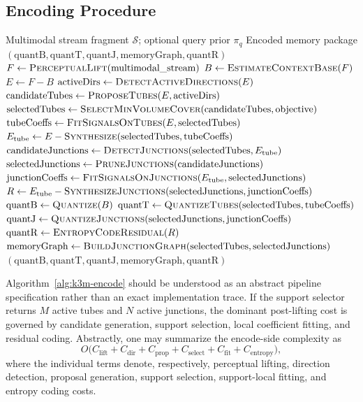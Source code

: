\documentclass[11pt]{article}
\begin{document}
\subsection{Encoding Procedure}
\begin{algorithm}[h]
\caption{Reference support-first K3M encoding procedure}
\label{alg:k3m-encode}
\begin{algorithmic}[1]
\Require Multimodal stream fragment $\mathcal{S}$; optional query prior $\pi_q$
\Ensure Encoded memory package $(\mathrm{quantB}, \mathrm{quantT}, \mathrm{quantJ}, \mathrm{memoryGraph}, \mathrm{quantR})$
\State $F \gets \Call{PerceptualLift}{\text{multimodal\_stream}}$
\State $B \gets \Call{EstimateContextBase}{F}$
\State $E \gets F - B$
\State $\mathrm{activeDirs} \gets \Call{DetectActiveDirections}{E}$
\State $\mathrm{candidateTubes} \gets \Call{ProposeTubes}{E,\mathrm{activeDirs}}$
\State $\mathrm{selectedTubes} \gets \Call{SelectMinVolumeCover}{\mathrm{candidateTubes}, \text{objective}}$
\State $\mathrm{tubeCoeffs} \gets \Call{FitSignalsOnTubes}{E,\mathrm{selectedTubes}}$
\State $E_{\mathrm{tube}} \gets E - \Call{Synthesize}{\mathrm{selectedTubes},\mathrm{tubeCoeffs}}$
\State $\mathrm{candidateJunctions} \gets \Call{DetectJunctions}{\mathrm{selectedTubes},E_{\mathrm{tube}}}$
\State $\mathrm{selectedJunctions} \gets \Call{PruneJunctions}{\mathrm{candidateJunctions}}$
\State $\mathrm{junctionCoeffs} \gets \Call{FitSignalsOnJunctions}{E_{\mathrm{tube}},\mathrm{selectedJunctions}}$
\State $R \gets E_{\mathrm{tube}} - \Call{SynthesizeJunctions}{\mathrm{selectedJunctions},\mathrm{junctionCoeffs}}$
\State $\mathrm{quantB} \gets \Call{Quantize}{B}$
\State $\mathrm{quantT} \gets \Call{QuantizeTubes}{\mathrm{selectedTubes},\mathrm{tubeCoeffs}}$
\State $\mathrm{quantJ} \gets \Call{QuantizeJunctions}{\mathrm{selectedJunctions},\mathrm{junctionCoeffs}}$
\State $\mathrm{quantR} \gets \Call{EntropyCodeResidual}{R}$
\State $\mathrm{memoryGraph} \gets \Call{BuildJunctionGraph}{\mathrm{selectedTubes},\mathrm{selectedJunctions}}$
\State \Return $(\mathrm{quantB}, \mathrm{quantT}, \mathrm{quantJ}, \mathrm{memoryGraph}, \mathrm{quantR})$
\EndProcedure
\end{algorithmic}
\end{algorithm}
Algorithm~\ref{alg:k3m-encode} should be understood as an abstract pipeline specification rather than an exact implementation trace. If the support selector returns $M$ active tubes and $N$ active junctions, the dominant post-lifting cost is governed by candidate generation, support selection, local coefficient fitting, and residual coding. Abstractly, one may summarize the encode-side complexity as
\begin{equation}
O\bigl(C_{\mathrm{lift}} + C_{\mathrm{dir}} + C_{\mathrm{prop}} + C_{\mathrm{select}} + C_{\mathrm{fit}} + C_{\mathrm{entropy}}\bigr),
\end{equation}
where the individual terms denote, respectively, perceptual lifting, direction detection, proposal generation, support selection, support-local fitting, and entropy coding costs.
\end{document}
